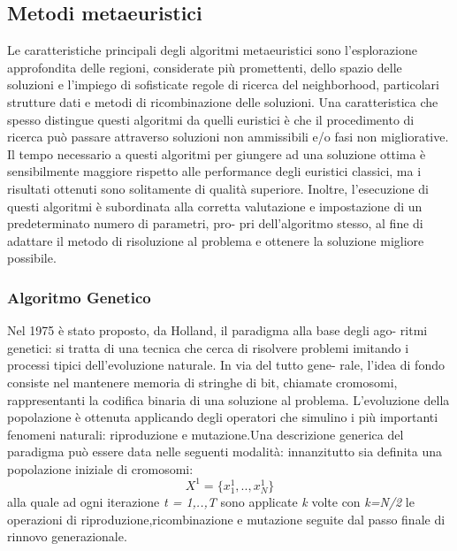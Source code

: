 \documentclass[]{article}
\begin{document}
\subsection{Metodi metaeuristici}
Le caratteristiche principali degli algoritmi metaeuristici sono l’esplorazione approfondita delle regioni, considerate più promettenti, dello spazio delle soluzioni e l’impiego di sofisticate regole di ricerca del neighborhood, particolari strutture dati e metodi di ricombinazione delle soluzioni. Una caratteristica che spesso distingue questi algoritmi da quelli
euristici è che il procedimento di ricerca può passare attraverso soluzioni
non ammissibili e/o fasi non migliorative.
Il tempo necessario a questi algoritmi per giungere ad una soluzione
ottima è sensibilmente maggiore rispetto alle performance degli euristici classici, ma i risultati ottenuti sono solitamente di qualità superiore.
Inoltre, l’esecuzione di questi algoritmi è subordinata alla corretta valutazione e impostazione di un predeterminato numero di parametri, pro-
pri dell’algoritmo stesso, al fine di adattare il metodo di risoluzione al
problema e ottenere la soluzione migliore possibile.

\subsubsection{Algoritmo Genetico}
Nel 1975 è stato proposto, da Holland, il paradigma alla base degli ago-
ritmi genetici: si tratta di una tecnica che cerca di risolvere problemi
imitando i processi tipici dell’evoluzione naturale. In via del tutto gene-
rale, l’idea di fondo consiste nel mantenere memoria di stringhe di bit,
chiamate cromosomi, rappresentanti la codifica binaria di una soluzione
al problema. L’evoluzione della popolazione è ottenuta applicando degli
operatori che simulino i più importanti fenomeni naturali: riproduzione
e mutazione.Una descrizione generica del paradigma può essere data nelle seguenti
modalità: innanzitutto sia definita una popolazione iniziale di cromosomi:
\begin{equation}
 X^1 = \{ x_{1}^1,..,x_{N}^1\}
\end{equation}
alla quale  ad ogni iterazione \emph{t = 1,..,T} sono applicate \emph{k} volte con \emph{k=N/2} le operazioni di riproduzione,ricombinazione e mutazione seguite dal passo finale di rinnovo generazionale.
\end{document}

